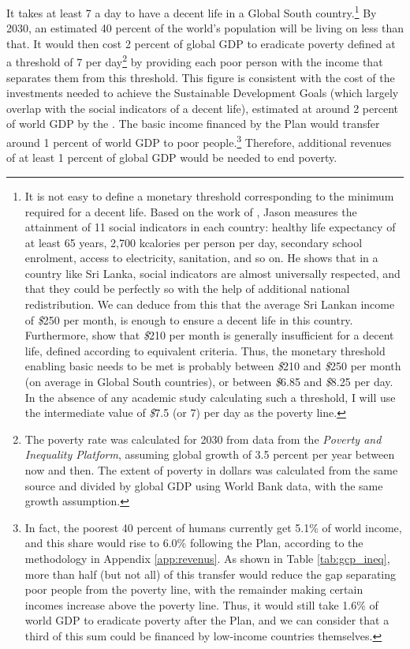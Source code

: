 \documentclass[a5paper,english,openany]{memoir}
\begin{document}
It takes at least \textit{\texteuro{}}7 a day to have a decent life in a Global South country.\footnote{It is not easy to define a monetary threshold corresponding to the minimum required for a decent life. Based on the work of \cite{oneill_good_2018}, Jason \cite{hickel_is_2019} measures the attainment of 11 social indicators in each country: healthy life expectancy of at least 65 years, 2,700 kcalories per person per day, secondary school enrolment, access to electricity, sanitation, and so on. He shows that in a country like Sri Lanka, social indicators are almost universally respected, and that they could be perfectly so with the help of additional national redistribution. We can deduce from this that the average Sri Lankan income of \textit{\$}250 
per month, %
is enough to ensure a decent life in this country. Furthermore, \cite{kikstra_decent_2021} show that \textit{\$}210 per month %
is generally insufficient for a decent life, defined according to equivalent criteria. Thus, the monetary threshold enabling basic needs to be met is probably between \textit{\$}210 and \textit{\$}250 per month (on average in Global South countries), or between \textit{\$}6.85 and \textit{\$}8.25 per day. In the absence of any academic study calculating such a threshold, I will use the intermediate value of \textit{\$}7.5 (or {\texteuro{}}7) per day as the poverty line.} 
By 2030, an estimated 40 percent of the world's population will be living on less than that. %
It would then cost 2 percent %
of global GDP to eradicate poverty defined at a threshold of \textit{\texteuro{}}7 per day\footnote{The poverty rate was calculated for 2030 from data from the \textit{Poverty and Inequality Platform}, assuming global growth of 3.5 percent per year between now and then. The extent of poverty in dollars was calculated from the same source and divided by global GDP using World Bank data, with the same growth assumption.} 
by providing each poor person with the income that separates them from this threshold. This figure is consistent with the cost of the investments needed to achieve the Sustainable Development Goals (which largely overlap with the social indicators of a decent life), estimated at around 2 percent of world GDP by the \citet{unctad_estimating_2021}. %
The basic income financed by the Plan would transfer around 1 percent of world GDP to poor people.\footnote{In fact, the poorest 40 percent %
of humans currently get 5.1\% of world income, and this share would rise to 6.0\% following the Plan, according to the methodology in Appendix \ref{app:revenus}. As shown in Table \ref{tab:gcp_ineq}, more than half (but not all) of this transfer would reduce the gap separating poor people from the poverty line, with the remainder making certain incomes increase above the poverty line. Thus, it would still take 1.6\% of world GDP to eradicate poverty after the Plan, and we can consider that a third of this sum could be financed by low-income countries themselves.} Therefore, 
additional revenues of at least 1 percent of global GDP would be needed to end poverty. %
\end{document}
